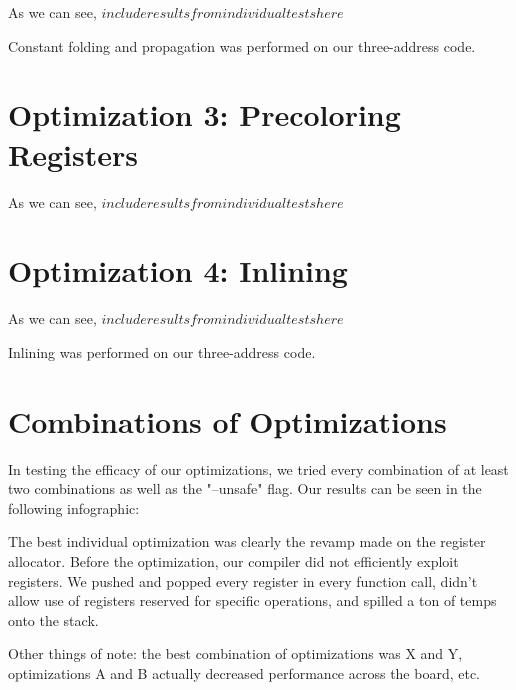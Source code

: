 \documentclass{article}
\begin{document}
As we can see, $include results from individual tests here$

Constant folding and propagation was performed on our three-address code.

\section{Optimization 3: Precoloring Registers}




As we can see, $include results from individual tests here$



\section{Optimization 4: Inlining}


As we can see, $include results from individual tests here$

Inlining was performed on our three-address code.

\section{Combinations of Optimizations}

In testing the efficacy of our optimizations, we tried every combination of at least two combinations as well as the "--unsafe" flag. Our results can be seen in the following infographic:






The best individual optimization was clearly the revamp made on the register allocator. Before the optimization, our compiler did not efficiently exploit registers. We pushed and popped every register in every function call, didn't allow use of registers reserved for specific operations, and spilled a ton of temps onto the stack. 

Other things of note: the best combination of optimizations was X and Y, optimizations A and B actually decreased performance across the board, etc.
\end{document}
